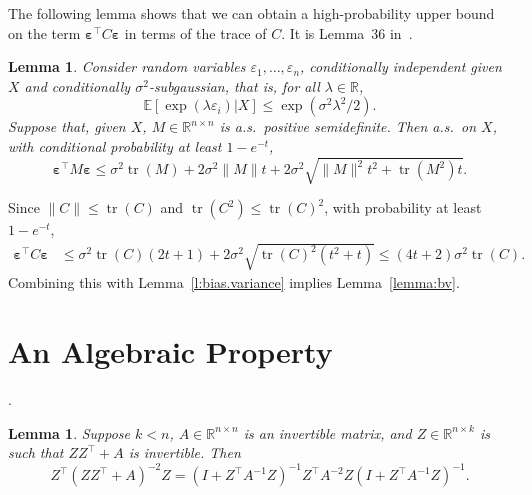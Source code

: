 \documentclass[11pt,notitlepage]{article}
\newcommand\E {\mathbb{E}}
\newcommand\R {\mathbb{R}}
\renewcommand\Re{\R}
\newcommand\bs {\boldsymbol}
\newcommand\eps {\varepsilon}
\newcommand\tr {\ensuremath{\operatorname{\mathrm{tr}}}}
\newtheorem{lemma}[theorem]{Lemma}
\begin{document}
The following lemma shows that we can obtain a high-probability upper
bound on the term $\bs{\eps}^\top C\bs{\eps}$ in terms
of the trace of $C$. It is Lemma~36 in~\cite{Page2017}.
\begin{lemma}
	\label{lemma::subgaussian-quadratic-form}
  Consider random variables $\eps_1,\ldots,\eps_n$, conditionally
  independent given $X$ and conditionally $\sigma^2$-subgaussian, that
  is, for all $\lambda\in\Re$,
    \[
      \E[\exp(\lambda\eps_i)|X] \leq \exp(\sigma^2\lambda^2/2).
    \]
  Suppose that, given $X$, $M\in\Re^{n\times n}$ is a.s.~positive
  semidefinite. Then a.s.~on $X$, with conditional probability at
  least $1-e^{-t}$,
    \[
      \bs{\eps}^\top M \bs{\eps}
        \le \sigma^2\tr(M) + 2\sigma^2 \|M\|t
          + 2\sigma^2\sqrt{\|M\|^2 t^2 +
          \tr\left(M^2\right)t}.
    \]
\end{lemma}
Since $\|C\|\leq \tr(C)$ and $\tr(C^2) \leq \tr(C)^2$,
with probability at least $1-e^{-t}$,
  \begin{align*}
    \bs{\eps}^\top C\bs{\eps}
      & \leq \sigma^2\tr(C)(2t+1) + 2\sigma^2\sqrt{\tr(C)^2(t^2 + t)}
      \leq (4t+2)\sigma^2\tr(C).
  \end{align*}
Combining this with Lemma~\ref{l:bias.variance}
implies Lemma~\ref{lemma:bv}.

\section{An Algebraic Property}\label{appendix:SMWproof}.

\begin{lemma}\label{lemma::SMW_formula}
  Suppose $k < n$, $A \in \R^{n\times n}$ is an invertible matrix,
  and $Z \in \R^{n\times k}$ is such that $ZZ^\top + A$ is invertible.
  Then
    \[
      Z^\top (ZZ^\top + A)^{-2} Z
      = (I +  Z^\top A^{-1}Z)^{-1}Z^\top A^{-2}Z
        (I +  Z^\top A^{-1}Z)^{-1}.
     \]
\end{lemma}
\end{document}
